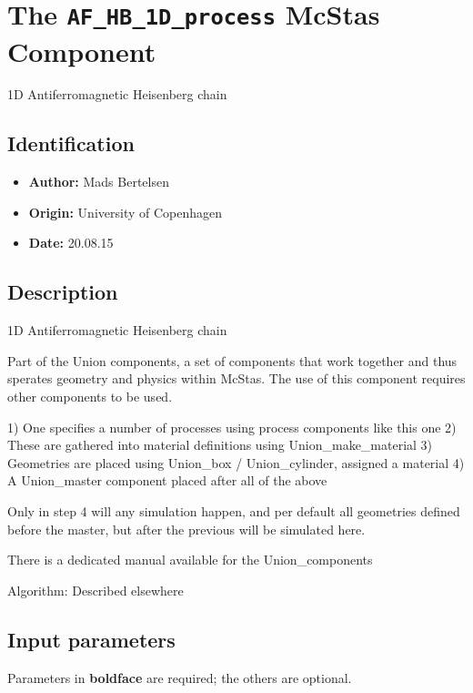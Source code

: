 \section{The \texttt{AF\_HB\_1D\_process} McStas Component}
1D Antiferromagnetic Heisenberg chain

\subsection*{Identification}
\begin{itemize}
  \item \textbf{Author:} Mads Bertelsen
  \item \textbf{Origin:} University of Copenhagen
  \item \textbf{Date:} 20.08.15
\end{itemize}

\subsection*{Description}
1D Antiferromagnetic Heisenberg chain

Part of the Union components, a set of components that work together and thus sperates geometry and physics within McStas. The use of this component requires other components to be used.

1) One specifies a number of processes using process components like this one 2) These are gathered into material definitions using Union\_make\_material 3) Geometries are placed using Union\_box / Union\_cylinder, assigned a material 4) A Union\_master component placed after all of the above

Only in step 4 will any simulation happen, and per default all geometries defined before the master, but after the previous will be simulated here.

There is a dedicated manual available for the Union\_components

Algorithm: Described elsewhere

\subsection*{Input parameters}
Parameters in \textbf{boldface} are required; the others are optional.

